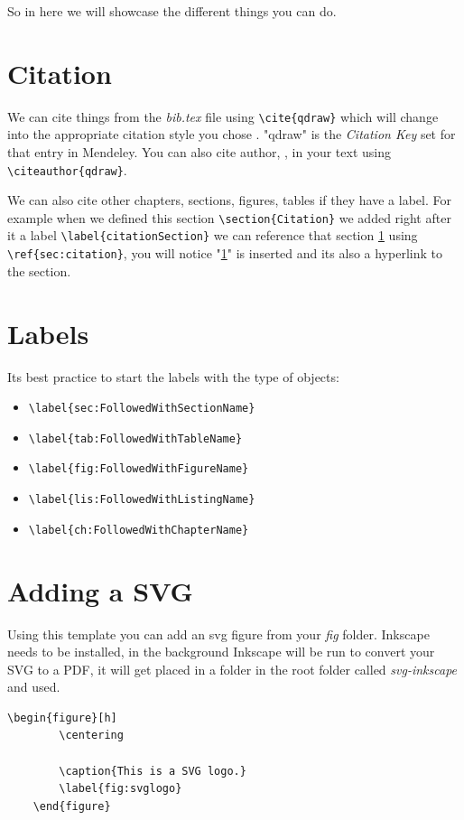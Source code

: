 So in here we will showcase the different things you can do.

\section{Citation}
\label{sec:citation}
We can cite things from the \emph{bib.tex} file using \verb=\cite{qdraw}= which will change into the appropriate citation style you chose \cite{qdraw}. "qdraw" is the \emph{Citation Key} set for that entry in Mendeley. You can also cite author, \citeauthor{qdraw}, in your text using \verb=\citeauthor{qdraw}=.

We can also cite other chapters, sections, figures, tables if they have a label. For example when we defined this section \verb=\section{Citation}= we added right after it a label \verb=\label{citationSection}= we can reference that section \ref{sec:citation} using \verb=\ref{sec:citation}=, you will notice "\ref{sec:citation}" is inserted and its also a hyperlink to the section.

\section{Labels}
Its best practice to start the labels with the type of objects:
\begin{itemize}
    \item \verb=\label{sec:FollowedWithSectionName}=
    \item \verb=\label{tab:FollowedWithTableName}=
    \item \verb=\label{fig:FollowedWithFigureName}=
    \item \verb=\label{lis:FollowedWithListingName}=
    \item \verb=\label{ch:FollowedWithChapterName}=
\end{itemize}

\section{Adding a SVG}
Using this template you can add an svg figure from your \emph{fig} folder. Inkscape needs to be installed, in the background Inkscape will be run to convert your SVG to a PDF, it will get placed in a folder in the root folder called \emph{svg-inkscape} and used.

\begin{Verbatim}[fontsize=\relsize{-1.5}]
    \begin{figure}[h]
        \centering
        
        \caption{This is a SVG logo.}
        \label{fig:svglogo}
    \end{figure}
\end{Verbatim}

